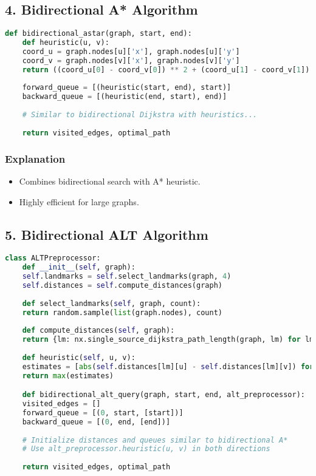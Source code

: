 \subsection*{4. Bidirectional A* Algorithm}
\begin{lstlisting}[language=Python, caption=Bidirectional A* Search]
	def bidirectional_astar(graph, start, end):
	def heuristic(u, v):
	coord_u = graph.nodes[u]['x'], graph.nodes[u]['y']
	coord_v = graph.nodes[v]['x'], graph.nodes[v]['y']
	return ((coord_u[0] - coord_v[0]) ** 2 + (coord_u[1] - coord_v[1]) ** 2) ** 0.5
	
	forward_queue = [(heuristic(start, end), start)]
	backward_queue = [(heuristic(end, start), end)]
	
	# Similar to bidirectional Dijkstra with heuristics...
	
	return visited_edges, optimal_path
\end{lstlisting}

\subsubsection*{Explanation}
\begin{itemize}
	\item Combines bidirectional search with A* heuristic.
	\item Highly efficient for large graphs.
\end{itemize}

\subsection*{5. Bidirectional ALT Algorithm}
\begin{lstlisting}[language=Python, caption=ALT Preprocessing for Heuristics]
	class ALTPreprocessor:
	def __init__(self, graph):
	self.landmarks = self.select_landmarks(graph, 4)
	self.distances = self.compute_distances(graph)
	
	def select_landmarks(self, graph, count):
	return random.sample(list(graph.nodes), count)
	
	def compute_distances(self, graph):
	return {lm: nx.single_source_dijkstra_path_length(graph, lm) for lm in self.landmarks}
	
	def heuristic(self, u, v):
	estimates = [abs(self.distances[lm][u] - self.distances[lm][v]) for lm in self.landmarks]
	return max(estimates)

	def bidirectional_alt_query(graph, start, end, alt_preprocessor):
	visited_edges = []
	forward_queue = [(0, start, [start])]
	backward_queue = [(0, end, [end])]
	
	# Initialize distances and queues similar to bidirectional A*
	# Use alt_preprocessor.heuristic(u, v) in both directions
	
	return visited_edges, optimal_path
\end{lstlisting}

